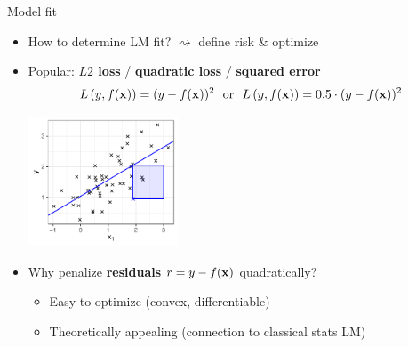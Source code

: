 \documentclass[11pt,compress,t,notes=noshow, xcolor=table]{beamer}
\begin{document}
\begin{frame}{Model fit}

\begin{itemize}
    \item How to determine LM fit? $\rightsquigarrow$ define risk \& optimize
    \item Popular: \textbf{$L2$ loss} / \textbf{quadratic loss} / 
    \textbf{squared error}
    $$L\left(y, f(\mathbf{x})\right) = (y-f(\mathbf{x}))^2 ~~ \text{or} ~~ L\left(y, f(\mathbf{x})\right) = 0.5 \cdot (y-f(\mathbf{x}))^2$$
    
    \includegraphics[width=0.35\textwidth]{figure/reg_l2_residual.pdf}
    \item Why penalize \textbf{residuals} $r = y - f(\mathbf{x})$ quadratically?
    \begin{itemize}
        \item Easy to optimize (convex, differentiable)
        \item Theoretically appealing (connection to classical stats LM)
    \end{itemize}
\end{itemize}

\end{frame}

\end{document}
